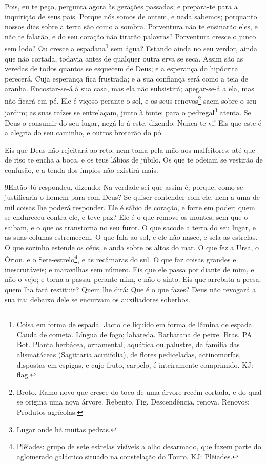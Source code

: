 Pois, eu te peço, pergunta agora às gerações passadas; e
prepara-te para a inquirição de seus pais. Porque nós somos de
ontem, e nada sabemos; porquanto nossos dias sobre a terra são como
a sombra. Porventura não te ensinarão eles, e não te falarão,
e do seu coração não tirarão palavras? Porventura cresce o
junco sem lodo? Ou cresce a espadana\footnote{Coisa em forma de
espada. Jacto de líquido em forma de lâmina de espada. Cauda de
cometa. Língua de fogo; labareda. Barbatana de peixe. Bras. PA Bot.
Planta herbácea, ornamental, aquática ou palustre, da família das
alismatáceas (Sagittaria acutifolia), de flores pediceladas,
actinomorfas, dispostas em espigas, e cujo fruto, carpelo, é
inteiramente comprimido. KJ: flag.} sem água? Estando ainda
no seu verdor, ainda que não cortada, todavia antes de qualquer
outra erva se seca. Assim são as veredas de todos quantos se
esquecem de Deus; e a esperança do hipócrita perecerá. Cuja
esperança fica frustrada; e a sua confiança será como a teia de
aranha. Encostar-se-á à sua casa, mas ela não subsistirá;
apegar-se-á a ela, mas não ficará em pé. Ele é viçoso perante
o sol, e os seus renovos\footnote{Broto. Ramo novo que cresce do
toco de uma árvore recém-cortada, e do qual se origina uma nova
árvore. Rebento. Fig. Descendência, renova. Renovos: Produtos
agrícolas.} saem sobre o seu jardim; as suas raízes se
entrelaçam, junto à fonte; para o pedregal\footnote{Lugar onde há
muitas pedras.} atenta. Se Deus o consumir do seu lugar,
negá-lo-á este, dizendo: Nunca te vi! Eis que este é a
alegria do seu caminho, e outros brotarão do pó.

Eis que Deus não rejeitará ao reto; nem toma pela mão aos
malfeitores; até que de riso te encha a boca, e os teus
lábios de júbilo. Os que te odeiam se vestirão de confusão, e
a tenda dos ímpios não existirá mais.

\medskip

\lettrine{9} Então Jó respondeu, dizendo: Na verdade sei
que assim é; porque, como se justificaria o homem para com Deus?
Se quiser contender com ele, nem a uma de mil coisas lhe poderá
responder. Ele é sábio de coração, e forte em poder; quem se
endureceu contra ele, e teve paz? Ele é o que remove os montes,
sem que o saibam, e o que os transtorna no seu furor. O que
sacode a terra do seu lugar, e as suas colunas estremecem. O que
fala ao sol, e ele não nasce, e sela as estrelas. O que sozinho
estende os céus, e anda sobre os altos do mar. O que fez a Ursa,
o Órion, e o Sete-estrelo\footnote{Plêiades: grupo de sete estrelas
visíveis a olho desarmado, que fazem parte do aglomerado galáctico
situado na constelação do Touro. KJ: Plêiades.}, e as recâmaras do
sul. O que faz coisas grandes e inescrutáveis; e maravilhas
sem número. Eis que ele passa por diante de mim, e não o
vejo; e torna a passar perante mim, e não o sinto. Eis que
arrebata a presa; quem lha fará restituir? Quem lhe dirá: Que é o
que fazes? Deus não revogará a sua ira; debaixo dele se
encurvam os auxiliadores soberbos.

